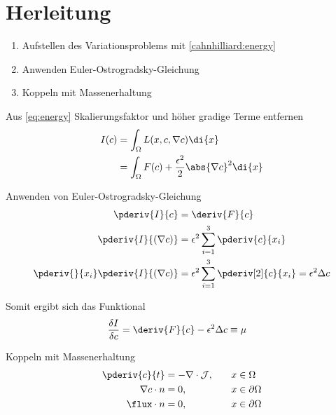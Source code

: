 %
%
%
%
\section{Herleitung\label{cahnhilliard:section:herleitung}}

\begin{enumerate}
\item Aufstellen des Variationsproblems mit \eqref{cahnhilliard:energy}
\item Anwenden Euler-Ostrogradsky-Gleichung
\item Koppeln mit Massenerhaltung
\end{enumerate}

Aus \eqref{eq:energy} Skalierungsfaktor und höher gradige Terme entfernen
\begin{align}
I(c)
&=
\int_\Omega L(x, c, \nabla c) \di{x}
\nonumber
\\
&=
\int_\Omega F(c) + \frac{\epsilon^2}{2} \abs{\nabla c}^2 \di{x}
\end{align}

Anwenden von Euler-Ostrogradsky-Gleichung
\begin{align*}
\pderiv{I}{c}
&=
\deriv{F}{c}
\\
\pderiv{I}{(\nabla c)}
&=
\epsilon^2 \sum_{i=1}^3 \pderiv{c}{x_i}
\\
\pderiv{}{x_i}\pderiv{I}{(\nabla c)}
&=
\epsilon^2 \sum_{i=1}^3 \pderiv[2]{c}{x_i}
=
\epsilon^2 \Delta c
\end{align*}

Somit ergibt sich das Funktional
\begin{align*}
\frac{\delta I}{\delta c}
&=
\deriv{F}{c} -  \epsilon^2 \Delta c
\equiv
\mu
\end{align*}

Koppeln mit Massenerhaltung
\begin{alignat*}{2}
\pderiv{c}{t}
&=
- \nabla \cdot \mathcal{J}
,\quad&
x &\in \Omega
\\
\nabla c \cdot n
&=
0
,&
x &\in \partial\Omega
\\
\flux \cdot n
&=
0
,&
x &\in \partial\Omega
\end{alignat*}

